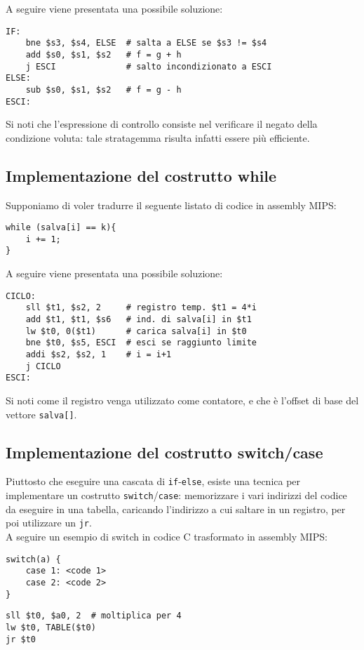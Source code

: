 A seguire viene presentata una possibile soluzione:
\begin{verbatim}
IF:
	bne $s3, $s4, ELSE  # salta a ELSE se $s3 != $s4
	add $s0, $s1, $s2   # f = g + h
	j ESCI              # salto incondizionato a ESCI
ELSE:
	sub $s0, $s1, $s2   # f = g - h
ESCI:
\end{verbatim}
Si noti che l'espressione di controllo consiste nel verificare il negato della condizione voluta: tale stratagemma risulta infatti essere più efficiente.

\subsection*{Implementazione del costrutto while}
Supponiamo di voler tradurre il seguente listato di codice in assembly MIPS:
\begin{verbatim}
while (salva[i] == k){
	i += 1;
}
\end{verbatim}

A seguire viene presentata una possibile soluzione:
\begin{verbatim}
CICLO:
	sll $t1, $s2, 2     # registro temp. $t1 = 4*i
	add $t1, $t1, $s6   # ind. di salva[i] in $t1
	lw $t0, 0($t1)      # carica salva[i] in $t0
	bne $t0, $s5, ESCI  # esci se raggiunto limite
	addi $s2, $s2, 1    # i = i+1
	j CICLO
ESCI:
\end{verbatim}
Si noti come il registro  venga utilizzato come contatore, e che  è l'offset di base del vettore \texttt{salva[]}.

\subsection*{Implementazione del costrutto switch/case}
Piuttosto che eseguire una cascata di \texttt{if}-\texttt{else}, esiste una tecnica per implementare un costrutto \texttt{switch}/\texttt{case}: memorizzare i vari indirizzi del codice da eseguire in una tabella, caricando l'indirizzo a cui saltare in un registro, per poi utilizzare un \texttt{jr}.\\
A seguire un esempio di switch in codice C trasformato in assembly MIPS:
\begin{verbatim}
switch(a) {
	case 1: <code 1>
	case 2: <code 2>
}
\end{verbatim}
\begin{verbatim}
sll $t0, $a0, 2  # moltiplica per 4
lw $t0, TABLE($t0)
jr $t0
\end{verbatim}

